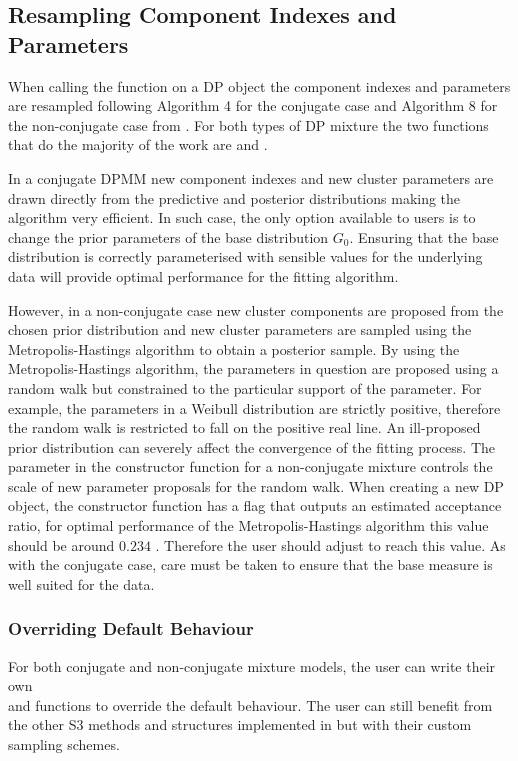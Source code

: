 \documentclass[nojss]{jss}
\begin{document}
\subsection{Resampling Component Indexes and Parameters}
When calling the  function on a DP object the component indexes and parameters are resampled following Algorithm 4 for the conjugate case and Algorithm 8 for the non-conjugate case from \cite{neal_markov_2000}. For both types of DP mixture the two functions that do the majority of the work are  and .

In a conjugate DPMM new component indexes and new cluster parameters are drawn directly from the predictive and posterior distributions making the algorithm very efficient. In such case, the only option available to users is to change the prior parameters of the base distribution $G_0$. Ensuring that the base distribution is correctly parameterised with sensible values for the underlying data will provide optimal performance for the fitting algorithm.

However, in a non-conjugate case new cluster components are proposed from the chosen prior distribution and new cluster parameters are sampled using the Metropolis-Hastings algorithm to obtain a posterior sample. By using the Metropolis-Hastings algorithm, the parameters in question are proposed using a random walk but constrained to the particular support of the parameter. For example, the parameters in a Weibull distribution are strictly positive, therefore the random walk is restricted to fall on the positive real line. An ill-proposed prior distribution can severely affect the convergence of the fitting process. The parameter  in the constructor function for a non-conjugate mixture controls the scale of new parameter proposals for the random walk. When creating a new DP object, the constructor function has a flag  that outputs an estimated acceptance ratio, for optimal performance of the Metropolis-Hastings algorithm this value should be around $0.234$ \citep{gelman_efficient_1996}. Therefore the user should adjust  to reach this value. As with the conjugate case, care must be taken to ensure that the base measure is well suited for the data.

\subsubsection{Overriding Default Behaviour}
For both conjugate and non-conjugate mixture models, the user can write their own \\  and  functions to override the default behaviour. The user can still benefit from the other S3 methods and structures implemented in  but with their custom sampling schemes.
\end{document}
